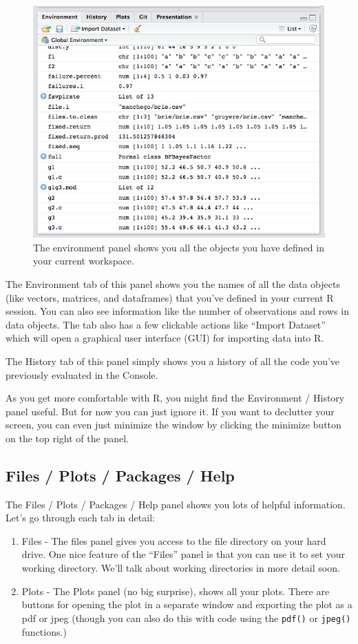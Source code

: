\documentclass[
]{book}
\begin{document}
\begin{figure}
\includegraphics[width=0.75\linewidth]{images/chapter-1/environmentss} \caption{The environment panel shows you all the objects you have defined in your current workspace.}\label{fig:environwindow}
\end{figure}

The Environment tab of this panel shows you the names of all the data objects (like vectors, matrices, and dataframes) that you've defined in your current R session. You can also see information like the number of observations and rows in data objects. The tab also has a few clickable actions like ``Import Dataset'' which will open a graphical user interface (GUI) for importing data into R.

The History tab of this panel simply shows you a history of all the code you've previously evaluated in the Console.

As you get more comfortable with R, you might find the Environment / History panel useful. But for now you can just ignore it. If you want to declutter your screen, you can even just minimize the window by clicking the minimize button on the top right of the panel.

\hypertarget{files-plots-packages-help}{%
\subsection{Files / Plots / Packages / Help}\label{files-plots-packages-help}}

The Files / Plots / Packages / Help panel shows you lots of helpful information. Let's go through each tab in detail:

\begin{enumerate}
\def\labelenumi{\arabic{enumi}.}
\item
  Files - The files panel gives you access to the file directory on your hard drive. One nice feature of the ``Files'' panel is that you can use it to set your working directory. We'll talk about working directories in more detail soon.
\item
  Plots - The Plots panel (no big surprise), shows all your plots. There are buttons for opening the plot in a separate window and exporting the plot as a pdf or jpeg (though you can also do this with code using the \texttt{pdf()} or \texttt{jpeg()} functions.)
\end{enumerate}
\end{document}
